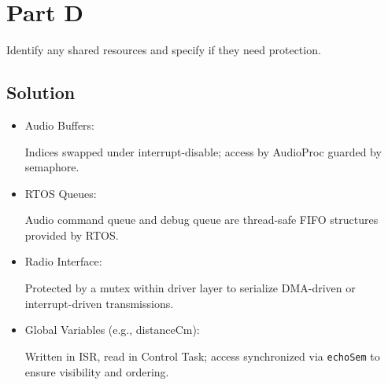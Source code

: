 \section*{Part D}

Identify any shared resources and specify if they need protection.

\subsection*{Solution}

\begin{itemize}
      \item Audio Buffers:

            Indices swapped under interrupt-disable; access by AudioProc guarded by semaphore.

      \item RTOS Queues:

            Audio command queue and debug queue are thread-safe FIFO structures provided by RTOS.\@

      \item Radio Interface:

            Protected by a mutex within driver layer to serialize DMA-driven or interrupt-driven transmissions.

      \item Global Variables (e.g., distanceCm):

            Written in ISR, read in Control Task; access synchronized via \texttt{echoSem} to ensure visibility and ordering.
\end{itemize}

